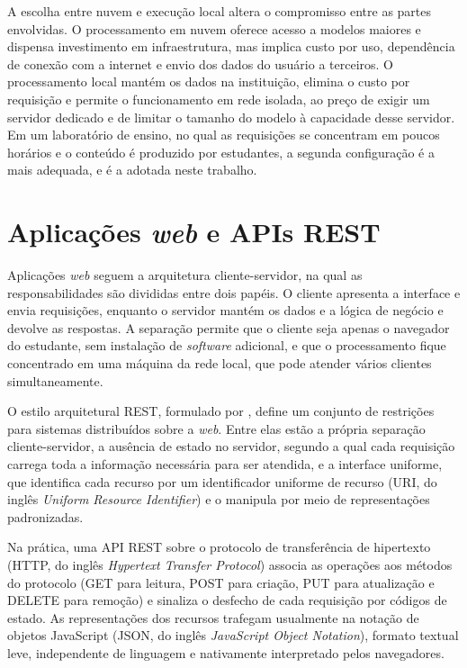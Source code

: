 A escolha entre nuvem e execução local altera o compromisso entre as partes envolvidas. O processamento em nuvem oferece acesso a modelos maiores e dispensa investimento em infraestrutura, mas implica custo por uso, dependência de conexão com a internet e envio dos dados do usuário a terceiros. O processamento local mantém os dados na instituição, elimina o custo por requisição e permite o funcionamento em rede isolada, ao preço de exigir um servidor dedicado e de limitar o tamanho do modelo à capacidade desse servidor. Em um laboratório de ensino, no qual as requisições se concentram em poucos horários e o conteúdo é produzido por estudantes, a segunda configuração é a mais adequada, e é a adotada neste trabalho.

\section{Aplicações \textit{web} e APIs REST}
\label{sec:web-rest}

Aplicações \textit{web} seguem a arquitetura cliente-servidor, na qual as responsabilidades são divididas entre dois papéis. O cliente apresenta a interface e envia requisições, enquanto o servidor mantém os dados e a lógica de negócio e devolve as respostas. A separação permite que o cliente seja apenas o navegador do estudante, sem instalação de \textit{software} adicional, e que o processamento fique concentrado em uma máquina da rede local, que pode atender vários clientes simultaneamente.

O estilo arquitetural REST, formulado por , define um conjunto de restrições para sistemas distribuídos sobre a \textit{web}. Entre elas estão a própria separação cliente-servidor, a ausência de estado no servidor, segundo a qual cada requisição carrega toda a informação necessária para ser atendida, e a interface uniforme, que identifica cada recurso por um identificador uniforme de recurso (URI, do inglês \textit{Uniform Resource Identifier}) e o manipula por meio de representações padronizadas.

Na prática, uma API REST sobre o protocolo de transferência de hipertexto (HTTP, do inglês \textit{Hypertext Transfer Protocol}) associa as operações aos métodos do protocolo (GET para leitura, POST para criação, PUT para atualização e DELETE para remoção) e sinaliza o desfecho de cada requisição por códigos de estado. As representações dos recursos trafegam usualmente na notação de objetos JavaScript (JSON, do inglês \textit{JavaScript Object Notation}), formato textual leve, independente de linguagem e nativamente interpretado pelos navegadores.

